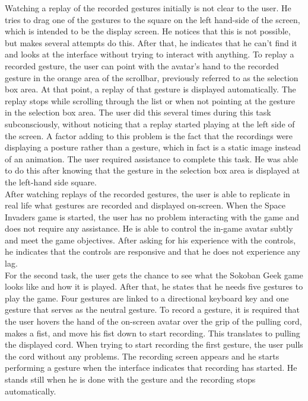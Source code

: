 Watching a replay of the recorded gestures initially is not clear to the user. He tries to drag one of the gestures to the square on the left hand-side of the screen, which is intended to be the display screen. He notices that this is not possible, but makes several attempts do this. After that, he indicates that he can't find it and looks at the interface without trying to interact with anything. To replay a recorded gesture, the user can point with the avatar's hand to the recorded gesture in the orange area of the scrollbar, previously referred to as the selection box area. At that point, a replay of that gesture is displayed automatically. The replay stops while scrolling through the list or when not pointing at the gesture in the selection box area. The user did this several times during this task subconsciously, without noticing that a replay started playing at the left side of the screen. A factor adding to this problem is the fact that the recordings were displaying a posture rather than a gesture, which in fact is a static image instead of an animation. The user required assistance to complete this task. He was able to do this after knowing that the gesture in the selection box area is displayed at the left-hand side square.\\

After watching replays of the recorded gestures, the user is able to replicate in real life what gestures are recorded and displayed on-screen. When the Space Invaders game is started, the user has no problem interacting with the game and does not require any assistance. He is able to control the in-game avatar subtly and meet the game objectives. After asking for his experience with the controls, he indicates that the controls are responsive and that he does not experience any lag.\\

For the second task, the user gets the chance to see what the Sokoban Geek game looks like and how it is played. After that, he states that he needs five gestures to play the game. Four gestures are linked to a directional keyboard key and one gesture that serves as the neutral gesture. To record a gesture, it is required that the user hovers the hand of the on-screen avatar over the grip of the pulling cord, makes a fist, and move his fist down to start recording. This translates to pulling the displayed cord. When trying to start recording the first gesture, the user pulls the cord without any problems. The recording screen appears and he starts performing a gesture when the interface indicates that recording has started. He stands still when he is done with the gesture and the recording stops automatically.\\


